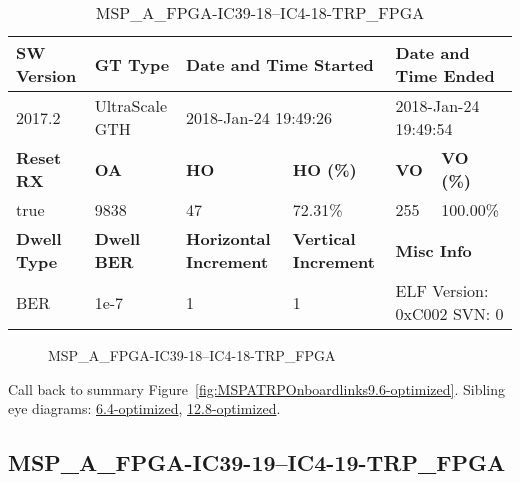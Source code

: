 \begin{table}[h]
\centering
\caption{MSP\_A\_FPGA-IC39-18--IC4-18-TRP\_FPGA}
\label{tab:MSPAFPGAIC3918IC418TRPFPGA9.6-optimized}
\begin{tabular}{@{}|l|l|l|l|l|l|@{}}
\toprule
\textbf{SW Version}                & \textbf{GT Type}   & \multicolumn{2}{l|}{\textbf{Date and Time Started}}            & \multicolumn{2}{l|}{\textbf{Date and Time Ended}}        \\ \midrule
2017.2                       & UltraScale GTH          & \multicolumn{2}{l|}{2018-Jan-24 19:49:26}                   & \multicolumn{2}{l|}{2018-Jan-24 19:49:54}               \\ \midrule
\textbf{Reset RX}                  & \textbf{OA} & \textbf{HO}   & \textbf{HO (\%)} & \textbf{VO} & \textbf{VO (\%)} \\ \midrule
true & 9838        & 47          & 72.31\%        & 255        & 100.00\%       \\ \midrule
\textbf{Dwell Type}                & \textbf{Dwell BER} & \textbf{Horizontal Increment} & \textbf{Vertical Increment}    & \multicolumn{2}{l|}{\textbf{Misc Info}}                  \\ \midrule
BER                            & 1e-7        & 1        & 1           & \multicolumn{2}{l|}{ELF Version: 0xC002 SVN: 0}                         \\ \bottomrule
\end{tabular}
\end{table}

\begin{figure}[h]
\caption{MSP\_A\_FPGA-IC39-18--IC4-18-TRP\_FPGA} \label{fig:MSPAFPGAIC3918IC418TRPFPGA9.6-optimized}
\end{figure}

Call back to summary Figure~\ref{fig:MSPATRPOnboardlinks9.6-optimized}.
Sibling eye diagrams: \hyperref[sec:MSPAFPGAIC3918IC418TRPFPGA6.4-optimized]{6.4-optimized}, \hyperref[sec:MSPAFPGAIC3918IC418TRPFPGA12.8-optimized]{12.8-optimized}.

\clearpage
\newpage


\subsection{MSP\_A\_FPGA-IC39-19--IC4-19-TRP\_FPGA}\label{sec:MSPAFPGAIC3919IC419TRPFPGA9.6-optimized}

